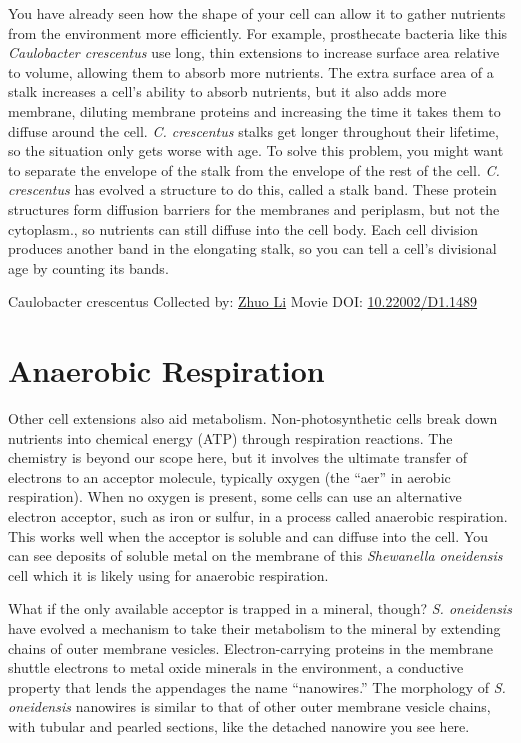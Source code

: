 \documentclass[]{tufte-book}
\begin{document}
You have already seen how the shape of your cell can allow it to gather nutrients from the environment more efficiently. For example, prosthecate bacteria like this \emph{Caulobacter crescentus} use long, thin extensions to increase surface area relative to volume, allowing them to absorb more nutrients. The extra surface area of a stalk increases a cell's ability to absorb nutrients, but it also adds more membrane, diluting membrane proteins and increasing the time it takes them to diffuse around the cell. \emph{C. crescentus} stalks get longer throughout their lifetime, so the situation only gets worse with age. To solve this problem, you might want to separate the envelope of the stalk from the envelope of the rest of the cell. \emph{C. crescentus} has evolved a structure to do this, called a stalk band. These protein structures form diffusion barriers for the membranes and periplasm, but not the cytoplasm., so nutrients can still diffuse into the cell body. Each cell division produces another band in the elongating stalk, so you can tell a cell's divisional age by counting its bands.



\hypertarget{htmlwidget-ecd1dc6357d91bf3daab}{}

\label{fig:4-1}Caulobacter crescentus Collected by: \protect\hyperlink{zhuo_li}{Zhuo Li} Movie DOI: \href{https://doi.org/10.22002/D1.1489}{10.22002/D1.1489}

\hypertarget{anaerobic-respiration}{%
\section{Anaerobic Respiration}\label{anaerobic-respiration}}

Other cell extensions also aid metabolism. Non-photosynthetic cells break down nutrients into chemical energy (ATP) through respiration reactions. The chemistry is beyond our scope here, but it involves the ultimate transfer of electrons to an acceptor molecule, typically oxygen (the ``aer'' in aerobic respiration). When no oxygen is present, some cells can use an alternative electron acceptor, such as iron or sulfur, in a process called anaerobic respiration. This works well when the acceptor is soluble and can diffuse into the cell. You can see deposits of soluble metal on the membrane of this \emph{Shewanella oneidensis} cell which it is likely using for anaerobic respiration.

What if the only available acceptor is trapped in a mineral, though? \emph{S. oneidensis} have evolved a mechanism to take their metabolism to the mineral by extending chains of outer membrane vesicles. Electron-carrying proteins in the membrane shuttle electrons to metal oxide minerals in the environment, a conductive property that lends the appendages the name ``nanowires.'' The morphology of \emph{S. oneidensis} nanowires is similar to that of other outer membrane vesicle chains, with tubular and pearled sections, like the detached nanowire you see here.
\end{document}
